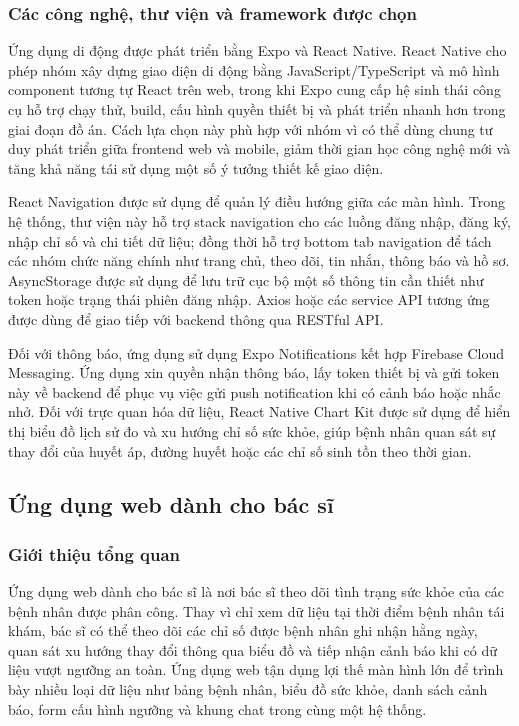 \subsubsection{Các công nghệ, thư viện và framework được chọn}
\par Ứng dụng di động được phát triển bằng Expo và React Native. React Native cho phép nhóm xây dựng giao diện di động bằng JavaScript/TypeScript và mô hình component tương tự React trên web, trong khi Expo cung cấp hệ sinh thái công cụ hỗ trợ chạy thử, build, cấu hình quyền thiết bị và phát triển nhanh hơn trong giai đoạn đồ án. Cách lựa chọn này phù hợp với nhóm vì có thể dùng chung tư duy phát triển giữa frontend web và mobile, giảm thời gian học công nghệ mới và tăng khả năng tái sử dụng một số ý tưởng thiết kế giao diện. \cite{expodocs}

\par React Navigation được sử dụng để quản lý điều hướng giữa các màn hình. Trong hệ thống, thư viện này hỗ trợ stack navigation cho các luồng đăng nhập, đăng ký, nhập chỉ số và chi tiết dữ liệu; đồng thời hỗ trợ bottom tab navigation để tách các nhóm chức năng chính như trang chủ, theo dõi, tin nhắn, thông báo và hồ sơ. AsyncStorage được sử dụng để lưu trữ cục bộ một số thông tin cần thiết như token hoặc trạng thái phiên đăng nhập. Axios hoặc các service API tương ứng được dùng để giao tiếp với backend thông qua RESTful API.

\par Đối với thông báo, ứng dụng sử dụng Expo Notifications kết hợp Firebase Cloud Messaging. Ứng dụng xin quyền nhận thông báo, lấy token thiết bị và gửi token này về backend để phục vụ việc gửi push notification khi có cảnh báo hoặc nhắc nhở. Đối với trực quan hóa dữ liệu, React Native Chart Kit được sử dụng để hiển thị biểu đồ lịch sử đo và xu hướng chỉ số sức khỏe, giúp bệnh nhân quan sát sự thay đổi của huyết áp, đường huyết hoặc các chỉ số sinh tồn theo thời gian. \cite{firebasecloudmessaging}

\subsection{Ứng dụng web dành cho bác sĩ}

\subsubsection{Giới thiệu tổng quan}
\par Ứng dụng web dành cho bác sĩ là nơi bác sĩ theo dõi tình trạng sức khỏe của các bệnh nhân được phân công. Thay vì chỉ xem dữ liệu tại thời điểm bệnh nhân tái khám, bác sĩ có thể theo dõi các chỉ số được bệnh nhân ghi nhận hằng ngày, quan sát xu hướng thay đổi thông qua biểu đồ và tiếp nhận cảnh báo khi có dữ liệu vượt ngưỡng an toàn. Ứng dụng web tận dụng lợi thế màn hình lớn để trình bày nhiều loại dữ liệu như bảng bệnh nhân, biểu đồ sức khỏe, danh sách cảnh báo, form cấu hình ngưỡng và khung chat trong cùng một hệ thống.

